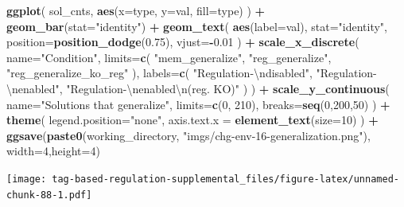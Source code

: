 \documentclass[
]{book}
\newenvironment{Shaded}{\begin{snugshade}}{\end{snugshade}}
\newcommand{\CharTok}[1]{\textcolor[rgb]{0.31,0.60,0.02}{#1}}
\newcommand{\DataTypeTok}[1]{\textcolor[rgb]{0.13,0.29,0.53}{#1}}
\newcommand{\DecValTok}[1]{\textcolor[rgb]{0.00,0.00,0.81}{#1}}
\newcommand{\FloatTok}[1]{\textcolor[rgb]{0.00,0.00,0.81}{#1}}
\newcommand{\KeywordTok}[1]{\textcolor[rgb]{0.13,0.29,0.53}{\textbf{#1}}}
\newcommand{\NormalTok}[1]{#1}
\newcommand{\OperatorTok}[1]{\textcolor[rgb]{0.81,0.36,0.00}{\textbf{#1}}}
\newcommand{\StringTok}[1]{\textcolor[rgb]{0.31,0.60,0.02}{#1}}
\begin{document}
\begin{Shaded}
\begin{Highlighting}[]
\KeywordTok{ggplot}\NormalTok{( sol\_cnts, }\KeywordTok{aes}\NormalTok{(}\DataTypeTok{x=}\NormalTok{type, }\DataTypeTok{y=}\NormalTok{val, }\DataTypeTok{fill=}\NormalTok{type) ) }\OperatorTok{+}
\StringTok{  }\KeywordTok{geom\_bar}\NormalTok{(}\DataTypeTok{stat=}\StringTok{"identity"}\NormalTok{) }\OperatorTok{+}
\StringTok{  }\KeywordTok{geom\_text}\NormalTok{(}
    \KeywordTok{aes}\NormalTok{(}\DataTypeTok{label=}\NormalTok{val),}
    \DataTypeTok{stat=}\StringTok{"identity"}\NormalTok{,}
    \DataTypeTok{position=}\KeywordTok{position\_dodge}\NormalTok{(}\FloatTok{0.75}\NormalTok{),}
    \DataTypeTok{vjust=}\OperatorTok{{-}}\FloatTok{0.01}
\NormalTok{  ) }\OperatorTok{+}
\StringTok{  }\KeywordTok{scale\_x\_discrete}\NormalTok{(}
    \DataTypeTok{name=}\StringTok{"Condition"}\NormalTok{,}
    \DataTypeTok{limits=}\KeywordTok{c}\NormalTok{(}
      \StringTok{"mem\_generalize"}\NormalTok{,}
      \StringTok{"reg\_generalize"}\NormalTok{,}
      \StringTok{"reg\_generalize\_ko\_reg"}
\NormalTok{      ),}
    \DataTypeTok{labels=}\KeywordTok{c}\NormalTok{(}
      \StringTok{"Regulation{-}}\CharTok{\textbackslash{}n}\StringTok{disabled"}\NormalTok{,}
      \StringTok{"Regulation{-}}\CharTok{\textbackslash{}n}\StringTok{enabled"}\NormalTok{,}
      \StringTok{"Regulation{-}}\CharTok{\textbackslash{}n}\StringTok{enabled}\CharTok{\textbackslash{}n}\StringTok{(reg. KO)"}
\NormalTok{    )}
\NormalTok{  ) }\OperatorTok{+}
\StringTok{  }\KeywordTok{scale\_y\_continuous}\NormalTok{(}
    \DataTypeTok{name=}\StringTok{"Solutions that generalize"}\NormalTok{,}
    \DataTypeTok{limits=}\KeywordTok{c}\NormalTok{(}\DecValTok{0}\NormalTok{, }\DecValTok{210}\NormalTok{),}
    \DataTypeTok{breaks=}\KeywordTok{seq}\NormalTok{(}\DecValTok{0}\NormalTok{,}\DecValTok{200}\NormalTok{,}\DecValTok{50}\NormalTok{)}
\NormalTok{  ) }\OperatorTok{+}
\StringTok{  }\KeywordTok{theme}\NormalTok{(}
    \DataTypeTok{legend.position=}\StringTok{"none"}\NormalTok{,}
    \DataTypeTok{axis.text.x =} \KeywordTok{element\_text}\NormalTok{(}\DataTypeTok{size=}\DecValTok{10}\NormalTok{)}
\NormalTok{  ) }\OperatorTok{+}
\StringTok{  }\KeywordTok{ggsave}\NormalTok{(}\KeywordTok{paste0}\NormalTok{(working\_directory, }\StringTok{"imgs/chg{-}env{-}16{-}generalization.png"}\NormalTok{), }\DataTypeTok{width=}\DecValTok{4}\NormalTok{,}\DataTypeTok{height=}\DecValTok{4}\NormalTok{)}
\end{Highlighting}
\end{Shaded}

\texttt{[image: tag-based-regulation-supplemental\_files/figure-latex/unnamed-chunk-88-1.pdf]}
\end{document}
